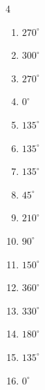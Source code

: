 \begin{multicols}{4}
\begin{enumerate}
  \item $\displaystyle 270^{\circ}$

  \item $\displaystyle 300^{\circ}$

  \item $\displaystyle 270^{\circ}$

  \item $\displaystyle 0^{\circ}$
        \phantom{$\displaystyle =0$}

  \item $\displaystyle 135^{\circ}$

  \item $\displaystyle 135^{\circ}$

  \item $\displaystyle 135^{\circ}$

  \item $\displaystyle 45^{\circ}$

  \item $\displaystyle 210^{\circ}$

\columnbreak %

  \item $\displaystyle 90^{\circ}$

  \item $\displaystyle 150^{\circ}$

  \item $\displaystyle 360^{\circ}$
        \phantom{$\displaystyle =2\pi$}

  \item $\displaystyle 330^{\circ}$

  \item $\displaystyle 180^{\circ}$
        \phantom{$\displaystyle =\pi$}

  \item $\displaystyle 135^{\circ}$

  \item $\displaystyle 0^{\circ}$
        \phantom{$\displaystyle =0$}


\end{enumerate}
\end{multicols}
